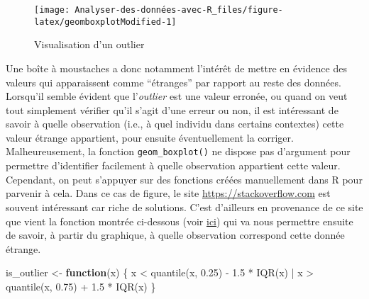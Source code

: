\documentclass[
]{book}
\newenvironment{Shaded}{\begin{snugshade}}{\end{snugshade}}
\newcommand{\ControlFlowTok}[1]{\textcolor[rgb]{0.13,0.29,0.53}{\textbf{#1}}}
\newcommand{\FloatTok}[1]{\textcolor[rgb]{0.00,0.00,0.81}{#1}}
\newcommand{\FunctionTok}[1]{\textcolor[rgb]{0.00,0.00,0.00}{#1}}
\newcommand{\NormalTok}[1]{#1}
\newcommand{\OtherTok}[1]{\textcolor[rgb]{0.56,0.35,0.01}{#1}}
\newcommand{\SpecialCharTok}[1]{\textcolor[rgb]{0.00,0.00,0.00}{#1}}
\begin{document}
\begin{figure}

{\centering \texttt{[image: Analyser-des-données-avec-R\_files/figure-latex/geomboxplotModified-1]} 

}

\caption{Visualisation d'un outlier}\label{fig:geomboxplotModified}
\end{figure}

Une boîte à moustaches a donc notamment l'intérêt de mettre en évidence des valeurs qui apparaissent comme ``étranges'' par rapport au reste des données. Lorsqu'il semble évident que l'\emph{outlier} est une valeur erronée, ou quand on veut tout simplement vérifier qu'il s'agit d'une erreur ou non, il est intéressant de savoir à quelle observation (i.e., à quel individu dans certains contextes) cette valeur étrange appartient, pour ensuite éventuellement la corriger. Malheureusement, la fonction \texttt{geom\_boxplot()} ne dispose pas d'argument pour permettre d'identifier facilement à quelle observation appartient cette valeur. Cependant, on peut s'appuyer sur des fonctions créées manuellement dans R pour parvenir à cela. Dans ce cas de figure, le site \url{https://stackoverflow.com} est souvent intéressant car riche de solutions. C'est d'ailleurs en provenance de ce site que vient la fonction montrée ci-dessous (voir \href{https://stackoverflow.com/questions/33524669/labeling-outliers-of-boxplots-in-r}{ici}) qui va nous permettre ensuite de savoir, à partir du graphique, à quelle observation correspond cette donnée étrange.

\begin{Shaded}
\begin{Highlighting}[]
\NormalTok{is\_outlier }\OtherTok{\textless{}{-}} \ControlFlowTok{function}\NormalTok{(x) \{}
\NormalTok{  x }\SpecialCharTok{\textless{}} \FunctionTok{quantile}\NormalTok{(x, }\FloatTok{0.25}\NormalTok{) }\SpecialCharTok{{-}} \FloatTok{1.5} \SpecialCharTok{*} \FunctionTok{IQR}\NormalTok{(x) }\SpecialCharTok{|}
\NormalTok{    x }\SpecialCharTok{\textgreater{}} \FunctionTok{quantile}\NormalTok{(x, }\FloatTok{0.75}\NormalTok{) }\SpecialCharTok{+} \FloatTok{1.5} \SpecialCharTok{*} \FunctionTok{IQR}\NormalTok{(x)}
\NormalTok{\}}
\end{Highlighting}
\end{Shaded}
\end{document}
